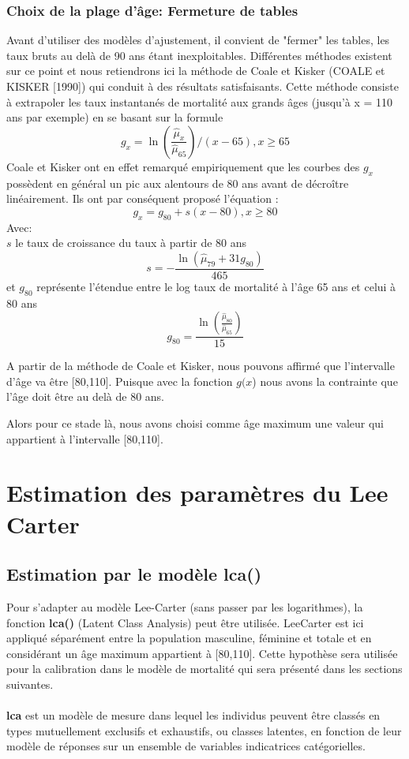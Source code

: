 \documentclass[french]{report}
\begin{document}
\subsubsection{Choix de la plage d'âge: Fermeture de tables}
Avant d’utiliser des modèles d’ajustement, il convient de "fermer" les tables, les
taux bruts au delà de 90 ans étant inexploitables. Différentes méthodes existent sur ce point et
nous retiendrons ici la méthode de Coale et Kisker (COALE et KISKER [1990])\cite{Coale et Kisker} qui conduit à
des résultats satisfaisants. Cette méthode consiste à extrapoler les taux instantanés de
mortalité aux grands âges (jusqu’à x = 110 ans par exemple) en se basant sur la formule
\[   g_{x} = \ln (\frac{ \hat \mu_{x}}{\hat \mu_{65}} )/ (x - 65), x\geq 65  \]
Coale et Kisker ont en effet remarqué empiriquement que les courbes des $g_{x}$
possèdent en général un pic aux alentours de 80 ans avant de décroître linéairement. Ils ont
par conséquent proposé l’équation :
\[   g_{x} = g_{80} + s (x- 80), x \geq 80\]
Avec: \\
$s$ le taux de croissance
du taux à partir de 80 ans
 \[   s = - \frac{\ln (\hat \mu_{79} + 31g_{80})}{465}   \]
 et $g_{80}$ représente l’étendue entre le log taux de mortalité à l’âge 65 ans et celui à 80 ans
 \[g_{80}=\frac{\ln(\frac{ \hat \mu_{80}}{\hat \mu_{65}} )}{15}\]
 
 
 A partir de la méthode de Coale et Kisker, nous pouvons affirmé que l'intervalle d'âge va être [80,110]. Puisque avec la fonction $g(x$) nous avons la contrainte que l'âge doit être au delà de 80 ans.
 
 Alors pour ce stade là, nous avons choisi comme âge maximum une valeur qui appartient à l'intervalle [80,110].

 

\section{Estimation des paramètres du Lee Carter}

\subsection{Estimation par le modèle \textbf{lca()}}
Pour s'adapter au modèle Lee-Carter (sans passer par les logarithmes), la fonction \textbf{lca()} (Latent Class Analysis) peut être utilisée. LeeCarter est ici appliqué séparément entre la population masculine, féminine et totale et en considérant un âge maximum appartient à [80,110]. Cette hypothèse sera utilisée pour la calibration dans le  modèle de
mortalité qui sera présenté dans les sections suivantes.\\
\\
\textbf{lca} est un modèle de mesure dans lequel les individus peuvent être classés en types mutuellement exclusifs et exhaustifs, ou classes latentes, en fonction de leur modèle de réponses sur un ensemble de variables indicatrices catégorielles.
\\
\end{document}
